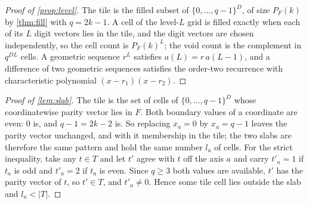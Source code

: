 \documentclass[11pt]{amsart}
\theoremstyle{definition}
\theoremstyle{remark}
\begin{document}
\begin{proof}[Proof of \cref{prop:level}]
The tile is the filled subset of $\{0,\dots,q-1\}^{D}$, of size $P_{F}(k)$ by \cref{thm:fill} with $q = 2k-1$. A cell of the level-$L$ grid is filled exactly when each of its $L$ digit vectors lies in the tile, and the digit vectors are chosen independently, so the cell count is $P_{F}(k)^{L}$; the void count is the complement in $q^{DL}$ cells. A geometric sequence $r^{L}$ satisfies $a(L) = r\,a(L-1)$, and a difference of two geometric sequences satisfies the order-two recurrence with characteristic polynomial $(x-r_{1})(x-r_{2})$.
\end{proof}

\begin{proof}[Proof of \cref{lem:slab}]
The tile is the set of cells of $\{0,\dots,q-1\}^{D}$ whose coordinatewise parity vector lies in $F$. Both boundary values of a coordinate are even: $0$ is, and $q-1 = 2k-2$ is. So replacing $x_{a}=0$ by $x_{a}=q-1$ leaves the parity vector unchanged, and with it membership in the tile; the two slabs are therefore the same pattern and hold the same number $l_{a}$ of cells. For the strict inequality, take any $t \in T$ and let $t'$ agree with $t$ off the axis $a$ and carry $t'_{a} = 1$ if $t_{a}$ is odd and $t'_{a} = 2$ if $t_{a}$ is even. Since $q \ge 3$ both values are available, $t'$ has the parity vector of $t$, so $t' \in T$, and $t'_{a} \neq 0$. Hence some tile cell lies outside the slab and $l_{a} < |T|$.
\end{proof}
\end{document}
